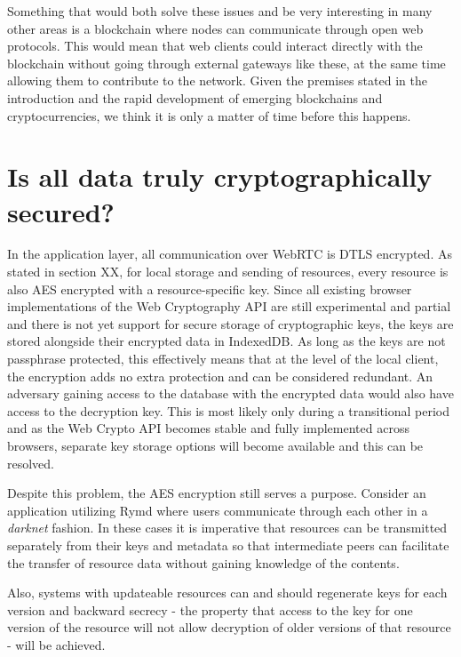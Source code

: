 Something that would both solve these issues and be very interesting in many other areas is a blockchain where nodes can communicate through open web protocols. This would mean that web clients could interact directly with the blockchain without going through external gateways like these, at the same time allowing them to contribute to the network. Given the premises stated in the introduction and the rapid development of emerging blockchains and cryptocurrencies, we think it is only a matter of time before this happens.

\section{Is all data truly cryptographically secured?}
In the application layer, all communication over WebRTC is DTLS encrypted. As stated in section XX, for local storage and sending of resources, every resource is also AES encrypted with a resource-specific key. Since all existing browser implementations of the Web Cryptography API are still experimental and partial and there is not yet support for secure storage of cryptographic keys, the keys are stored alongside their encrypted data in IndexedDB. As long as the keys are not passphrase protected, this effectively means that at the level of the local client, the encryption adds no extra protection and can be considered redundant. An adversary gaining access to the database with the encrypted data would also have access to the decryption key. This is most likely only during a transitional period and as the Web Crypto API becomes stable and fully implemented across browsers, separate key storage options will become available and this can be resolved.

Despite this problem, the AES encryption still serves a purpose. Consider an application utilizing Rymd where users communicate through each other in a \emph{darknet} fashion. In these cases it is imperative that resources can be transmitted separately from their keys and metadata so that intermediate peers can facilitate the transfer of resource data without gaining knowledge of the contents.

Also, systems with updateable resources can and should regenerate keys for each version and backward secrecy - the property that access to the key for one version of the resource will not allow decryption of older versions of that resource - will be achieved.

